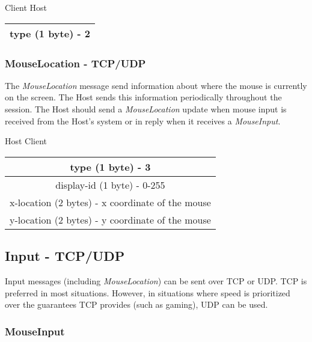 \documentclass{article}
\begin{document}
    \begin{center}
        Client \textrightarrow Host\\
        \begin{tabular}{|c|}
            \hline
            type (1 byte) - 2 \\
            \hline
        \end{tabular}
    \end{center}

    \subsubsection{MouseLocation - TCP/UDP}

    The \emph{MouseLocation} message send information about where the mouse is currently on the screen. The Host sends this information periodically throughout the session. The Host should send a \emph{MouseLocation} update when mouse input is received from the Host's system or in reply when it receives a \emph{MouseInput}.

    \begin{center}
        Host \textrightarrow Client\\
        \begin{tabular}{|c|}
            \hline
            type (1 byte) - 3                                \\
            \hline
            display-id (1 byte) - 0-255                      \\
            \hline
            x-location (2 bytes) - x coordinate of the mouse \\
            \hline
            y-location (2 bytes) - y coordinate of the mouse \\
            \hline
        \end{tabular}
    \end{center}

    \subsection{Input - TCP/UDP}

    Input messages (including \emph{MouseLocation}) can be sent over TCP or UDP. TCP is preferred in most situations. However, in situations where speed is prioritized over the guarantees TCP provides (such as gaming), UDP can be used.

    \subsubsection{MouseInput}
\end{document}
